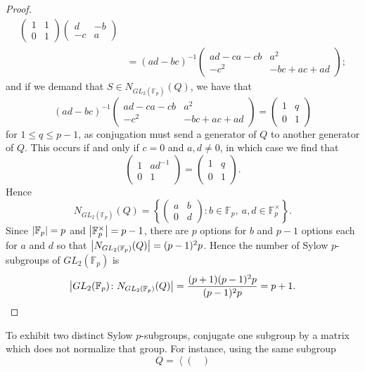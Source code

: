\documentclass[11pt]{article}
\newcommand{\br}[1]{\left(#1\right)}
\newcommand{\cbr}[1]{\left\{#1\right\}}
\begin{document}
\begin{enumerate}
\begin{proof}
\begin{align*}
\begin{pmatrix}
          1 & 1 \\ 0 & 1
        \end{pmatrix}\begin{pmatrix}
          d & -b \\ -c & a
        \end{pmatrix}\\
        &= \br{ad-bc}^{-1}\begin{pmatrix}
          ad-ca-cb & a^2 \\ -c^2 & -bc + ac + ad
        \end{pmatrix};
      \end{align*} and if we demand that $S\in N_{GL_2(\mathbb{F}_p)}(Q)$, we have that \[\br{ad-bc}^{-1}\begin{pmatrix}
        ad-ca-cb & a^2 \\ -c^2 & -bc + ac + ad
      \end{pmatrix} = \begin{pmatrix}
        1 & q \\ 0 & 1
      \end{pmatrix}\] for $1 \leq q \leq p-1$, as conjugation must send a generator of $Q$ to another generator of $Q$. This occurs if and only if $c= 0$ and $a,d\neq 0$, in which case we find that \[\begin{pmatrix}
        1 & ad^{-1} \\ 0 & 1
      \end{pmatrix} = \begin{pmatrix}
        1 & q \\ 0 & 1
      \end{pmatrix}.\]
      Hence \[N_{GL_2(\mathbb{F}_p)}(Q) = \cbr{\begin{pmatrix}
        a & b \\ 0 & d
      \end{pmatrix}\colon b\in \mathbb{F}_p,~  a,d\in \mathbb{F}_p^{\times}}.\] Since $\abs{\mathbb{F}_p} = p$ and $\abs{\mathbb{F}_p^{\times}} = p-1$, there are $p$ options for $b$ and $p-1$ options each for $a$ and $d$ so that $\abs{N_{GL_2(\mathbb{F}_p)}(Q)} = (p-1)^2p$. Hence the number of Sylow $p$-subgroups of $GL_2(\mathbb{F}_p)$ is \[\abs{GL_2(\mathbb{F}_p)\colon N_{GL_2(\mathbb{F}_p)}(Q)} = \frac{(p+1)(p-1)^2p}{(p-1)^2p} = p+1.\]
    \end{proof}
    To exhibit two distinct Sylow $p$-subgroups, conjugate one subgroup by a matrix which does not normalize that group. For instance, using the same subgroup \[Q = \left\langle \begin{pmatrix}

\end{pmatrix}\]
\end{enumerate}
\end{document}
